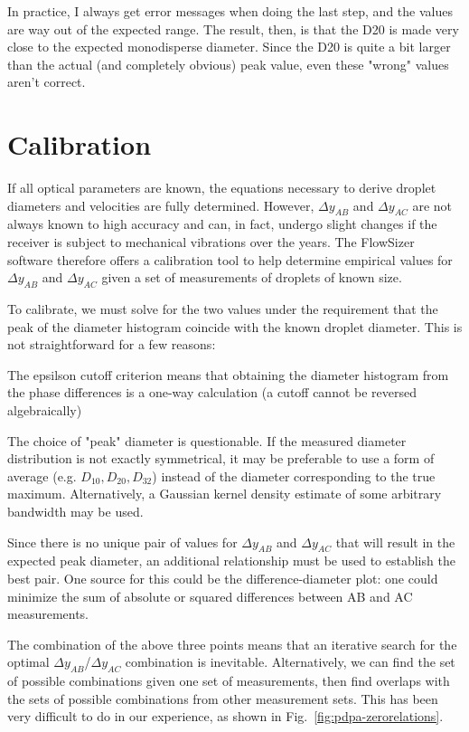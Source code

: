 \documentclass[11.5pt,oneside]{book}
\newcommand*{\figref}[1]{Fig.~\ref{#1}}
\begin{document}
In practice, I always get error messages when doing the last step, and the
values are way out of the expected range. The result, then, is that the D20 is
made very close to the expected monodisperse diameter. Since the D20 is quite
a bit larger than the actual (and completely obvious) peak value, even these
"wrong" values aren't correct.

\section{Calibration}
If all optical parameters are known, the equations necessary to derive droplet
diameters and velocities are fully determined. However, $\Delta y_{AB}$ and
$\Delta y_{AC}$ are not always known to high accuracy and can, in fact, undergo
slight changes if the receiver is subject to mechanical vibrations over the
years. The FlowSizer software therefore offers a calibration tool to help
determine empirical values for $\Delta y_{AB}$ and $\Delta y_{AC}$ given a set
of measurements of droplets of known size.

To calibrate, we must solve for the two values under the
requirement that the peak of the diameter histogram coincide with the known
droplet diameter. This is not straightforward for a few reasons:
\begin{alist}
\item The epsilson cutoff criterion means that obtaining the diameter histogram from
        the phase differences is a one-way calculation (a cutoff cannot be
        reversed algebraically)
\item The choice of "peak" diameter is questionable. If the measured diameter
        distribution is not exactly symmetrical, it may be preferable to use a
        form of average (e.g. $D_{10}, D_{20}, D_{32}$) instead of the diameter
        corresponding to the true maximum. Alternatively, a Gaussian kernel
        density estimate of some arbitrary bandwidth may be used.
\item Since there is no unique pair of values for $\Delta y_{AB}$ and $\Delta
        y_{AC}$ that will result in the expected peak diameter, an additional
        relationship must be used to establish the best pair. One source for
        this could be the difference-diameter plot: one could minimize the sum
        of absolute or squared differences between AB and AC measurements.
\end{alist}
The combination of the above three points means that an iterative search for the
optimal $\Delta y_{AB}$/$\Delta y_{AC}$ combination is inevitable.
Alternatively, we can find the set of possible combinations given one set of
measurements, then find overlaps with the sets of possible combinations from
other measurement sets. This has been very difficult to do in our experience, as
shown in \figref{fig:pdpa-zerorelations}.
\end{document}
